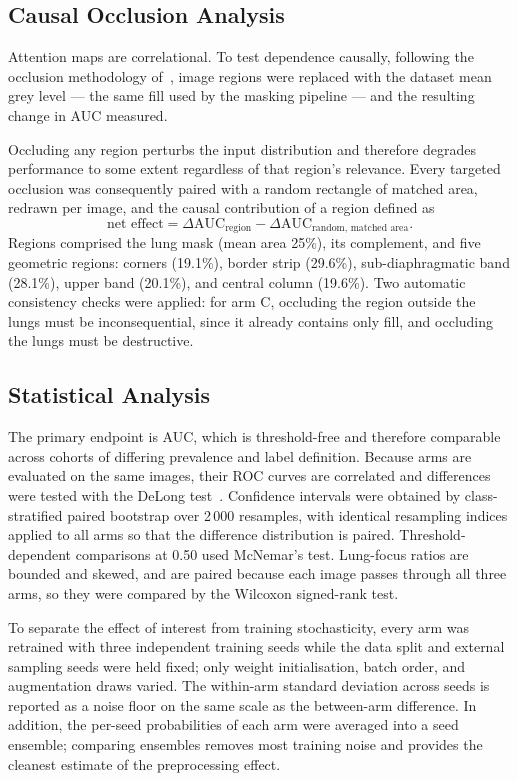 \documentclass[journal,twoside,web]{ieeecolor}
\begin{document}
\subsection{Causal Occlusion Analysis}
\label{sec:occ}

Attention maps are correlational. To test dependence causally, following the occlusion methodology of~\cite{zeiler2014}, image regions were replaced with the dataset mean grey level --- the same fill used by the masking pipeline --- and the resulting change in AUC measured.

Occluding any region perturbs the input distribution and therefore degrades performance to some extent regardless of that region's relevance. Every targeted occlusion was consequently paired with a random rectangle of matched area, redrawn per image, and the causal contribution of a region defined as
\begin{equation}
\text{net effect}=\Delta\mathrm{AUC}_{\text{region}}-\Delta\mathrm{AUC}_{\text{random, matched area}} .
\label{eq:net}
\end{equation}
Regions comprised the lung mask (mean area 25\%), its complement, and five geometric regions: corners (19.1\%), border strip (29.6\%), sub-diaphragmatic band (28.1\%), upper band (20.1\%), and central column (19.6\%). Two automatic consistency checks were applied: for arm C, occluding the region outside the lungs must be inconsequential, since it already contains only fill, and occluding the lungs must be destructive.

\subsection{Statistical Analysis}
\label{sec:stats}

The primary endpoint is AUC, which is threshold-free and therefore comparable across cohorts of differing prevalence and label definition. Because arms are evaluated on the same images, their ROC curves are correlated and differences were tested with the DeLong test~\cite{delong1988}. Confidence intervals were obtained by class-stratified paired bootstrap over 2\,000 resamples, with identical resampling indices applied to all arms so that the difference distribution is paired. Threshold-dependent comparisons at 0.50 used McNemar's test. Lung-focus ratios are bounded and skewed, and are paired because each image passes through all three arms, so they were compared by the Wilcoxon signed-rank test.

To separate the effect of interest from training stochasticity, every arm was retrained with three independent training seeds while the data split and external sampling seeds were held fixed; only weight initialisation, batch order, and augmentation draws varied. The within-arm standard deviation across seeds is reported as a noise floor on the same scale as the between-arm difference. In addition, the per-seed probabilities of each arm were averaged into a seed ensemble; comparing ensembles removes most training noise and provides the cleanest estimate of the preprocessing effect.
\end{document}
